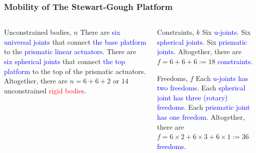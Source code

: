 \begin{frame}
	\frametitle{Mobility of The Stewart-Gough Platform}
	\begin{columns}[]
		\begin{column}{.45\linewidth}
			\begin{block}{Unconstrained bodies, $n$}
				There are \textcolor{blue}{six universal joints} that connect \textcolor{blue}{the base platform} to the \textcolor{blue}{prismatic linear actuators}. There are \textcolor{blue}{six spherical joints} that connect \textcolor{blue}{the top platform} to the top of the prismatic actuators. Altogether, there are $n=6+6+2$ or $14$ unconstrained \textcolor{red}{rigid bodies}.
			\end{block}
		\end{column}
		\begin{column}{.55\linewidth}
			\begin{block}{Constraints, $k$}			
				Six \textcolor{blue}{u-joints}. Six \textcolor{blue}{spherical joints}.  Six \textcolor{blue}{prismatic joints}. Altogether, there are $f=6+6+6:=18$ \textcolor{blue}{constraints}.
			\end{block}
			\begin{block}{Freedoms, $f$}			
				Each \textcolor{blue}{u-joints has two freedoms}. Each \textcolor{blue}{spherical joint has three (rotary) freedoms}.  Each \textcolor{blue}{prismatic joint has one freedom}. Altogether, there are $f=6\times2+6\times3+6\times1:=36$ \textcolor{blue}{freedoms}.
			\end{block}
		
		\end{column}
	\end{columns}
\end{frame}

